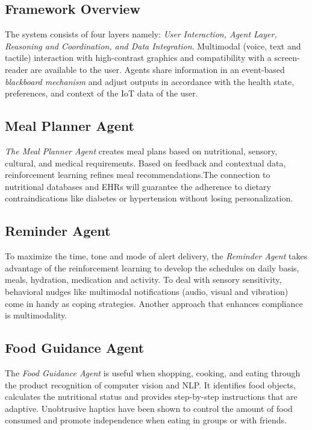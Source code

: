 \documentclass[pdflatex,sn-mathphys-num]{sn-jnl}
\begin{document}
\subsection{Framework Overview}

The system consists of four layers namely: \emph{User Interaction, Agent Layer, Reasoning and Coordination, and Data Integration}. Multimodal (voice, text and tactile) interaction with high-contrast graphics and compatibility with a screen-reader are available to the user. Agents share information in an event-based \emph{blackboard mechanism} and adjust outputs in accordance with the health state, preferences, and context of the IoT data of the user.

\subsection{Meal Planner Agent}

\emph{The Meal Planner Agent} creates meal plans based on nutritional, sensory, cultural, and medical requirements.
Based on feedback and contextual data, reinforcement learning refines meal recommendations.The connection to nutritional databases and EHRs will guarantee the adherence to dietary contraindications like diabetes or hypertension without losing personalization.

\subsection{Reminder Agent}
To maximize the time, tone and mode of alert delivery, the \emph{Reminder Agent} takes advantage of the reinforcement learning to develop the schedules on daily basis, meals, hydration, medication and activity. To deal with sensory sensitivity, behavioral nudges like multimodal notifications (audio, visual and vibration) come in handy as coping strategies. Another approach that enhances compliance is multimodality.

\subsection{Food Guidance Agent}

The \emph{Food Guidance Agent} is useful when shopping, cooking, and eating through the product recognition of computer vision and NLP. It identifies food objects, calculates the nutritional status and provides step-by-step instructions that are adaptive. Unobtrusive haptics have been shown to control the amount of food consumed and promote independence when eating in groups or with friends.
\end{document}
